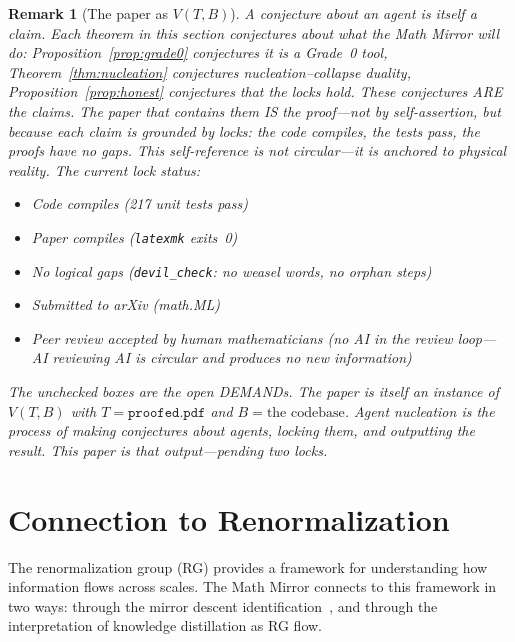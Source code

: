 \documentclass[11pt,a4paper]{article}
\newtheorem{remark}[theorem]{Remark}
\begin{document}
\begin{remark}[The paper as $V(T,B)$]\label{rem:self-ref}
A conjecture about an agent is itself a claim.
Each theorem in this section conjectures about what the Math Mirror
will do:
Proposition~\ref{prop:grade0} conjectures it is a Grade~0 tool,
Theorem~\ref{thm:nucleation} conjectures nucleation--collapse duality,
Proposition~\ref{prop:honest} conjectures that the locks hold.
These conjectures ARE the claims.
The paper that contains them IS the proof---not by self-assertion,
but because each claim is grounded by locks:
the code compiles, the tests pass, the proofs have no gaps.
This self-reference is not circular---it is anchored to physical
reality.
The current lock status:
\begin{itemize}[nosep]
\item[$\checkmark$] Code compiles (217 unit tests pass)
\item[$\checkmark$] Paper compiles (\texttt{latexmk} exits~0)
\item[$\checkmark$] No logical gaps
  (\texttt{devil\_check}: no weasel words, no orphan steps)
\item[$\square$] Submitted to arXiv (math.ML)
\item[$\square$] Peer review accepted by human mathematicians
  (no AI in the review loop---AI reviewing AI is circular
  and produces no new information)
\end{itemize}
The unchecked boxes are the open DEMANDs.
The paper is itself an instance of $V(T, B)$ with
$T = \texttt{proofed.pdf}$ and $B = \text{the codebase}$.
Agent nucleation is the process of making conjectures about agents,
locking them, and outputting the result.
This paper is that output---pending two locks.
\end{remark}

\section{Connection to Renormalization}\label{sec:rg}

The renormalization group (RG) provides a framework for
understanding how information flows across scales.
The Math Mirror connects to this framework in two ways:
through the mirror descent identification~\cite{Zhang2026YM},
and through the interpretation of knowledge distillation
as RG flow.
\end{document}
